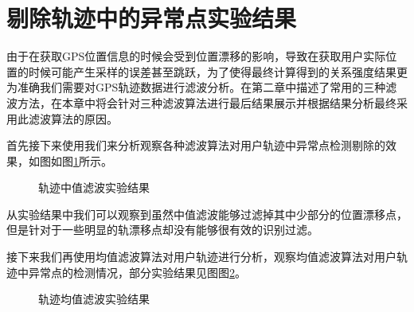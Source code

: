 \section{剔除轨迹中的异常点实验结果}
由于在获取GPS位置信息的时候会受到位置漂移的影响，导致在获取用户实际位置的时候可能产生采样的误差甚至跳跃，为了使得最终计算得到的关系强度结果更为准确我们需要对GPS轨迹数据进行滤波分析。在第二章中描述了常用的三种滤波方法，在本章中将会针对三种滤波算法进行最后结果展示并根据结果分析最终采用此滤波算法的原因。
\par 首先接下来使用我们来分析观察各种滤波算法对用户轨迹中异常点检测剔除的效果，如图如图\ref{fig:3_2_1}所示。
\begin{figure}[htb]
  \centering%
  \hspace{4em}%
  \caption{轨迹中值滤波实验结果}
  \label{fig:3_2_1}
\end{figure}
\par 从实验结果中我们可以观察到虽然中值滤波能够过滤掉其中少部分的位置漂移点，但是针对于一些明显的轨漂移点却没有能够很有效的识别过滤。
\par 接下来我们再使用均值滤波算法对用户轨迹进行分析，观察均值滤波算法对用户轨迹中异常点的检测情况，部分实验结果见图图\ref{fig:3_3_1}。
\begin{figure}[htb]
  \centering%
  \hspace{4em}%
  \caption{轨迹均值滤波实验结果}
  \label{fig:3_3_1}
\end{figure}
